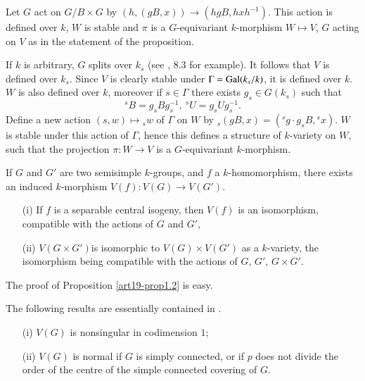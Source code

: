 Let $G$ act on $G/B\times G$ by $(h,(gB,x))\to (hgB,hxh^{-1})$. This action is defined over $k$, $W$ is stable and $\pi$ is a $G$-equivariant $k$-morphism $W\mapsto V$, $G$ acting on $V$ as in the statement of the proposition.

If $k$ is arbitrary, $G$ splits over $k_{s}$ (see \cite{art19-key2}, 8.3 for example). It follows that $V$ is defined over $k_{s}$. Since $V$ is clearly stable under $\Gamma=\operatorname{\mathrm{Gal}} (k_{s}/k)$, it is defined over $k$. $W$ is also defined over $k$, moreover if $s\in \Gamma$ there exists $g_{s}\in G(k_{s})$ such that
$$
{}^{s}B=g_{s}Bg^{-1}_{s}, \ {}^{s}U=g_{s}Ug^{-1}_{s}.
$$
Define a new action $(s,w)\mapsto {}_{s}w$ of $\Gamma$ on $W$ by ${}_{s}(gB,x)=({}^{s}g\cdot g_{s}B,{}^{s}x)$. $W$ is stable under this action of $\Gamma$, hence this defines a structure of $k$-variety on $W$, such that the projection $\pi : W\to V$ is a $G$-equivariant $k$-morphism.

If $G$ and $G'$ are two semisimple $k$-groups, and $f$ a $k$-homomorphism, there exists an induced $k$-morphism $V(f):V(G)\to V(G')$.

\begin{proposition}\label{art19-prop1.2}
\begin{itemize}
\item[\rm(i)] If $f$ is a separable central isogeny, then $V(f)$ is an isomorphism, compatible with the actions of $G$ and $G'$, 

\item[\rm(ii)] $V(G\times G')$\pageoriginale is isomorphic to $V(G)\times V(G')$ as a $k$-variety, the isomorphism being compatible with the actions of $G$, $G'$, $G\times G'$. 
\end{itemize}
\end{proposition}

The proof of Proposition \ref{art19-prop1.2} is easy.

The following results are essentially contained in \cite{art19-key15}.

\begin{proposition}\label{art19-prop1.3}
\begin{itemize}
\item[\rm(i)] $V(G)$ is nonsingular in codimension $1$;

\item[\rm(ii)] $V(G)$ is normal if $G$ is simply connected, or if $p$ does not divide the order of the centre of the simple connected covering of $G$.
\end{itemize}
\end{proposition}

